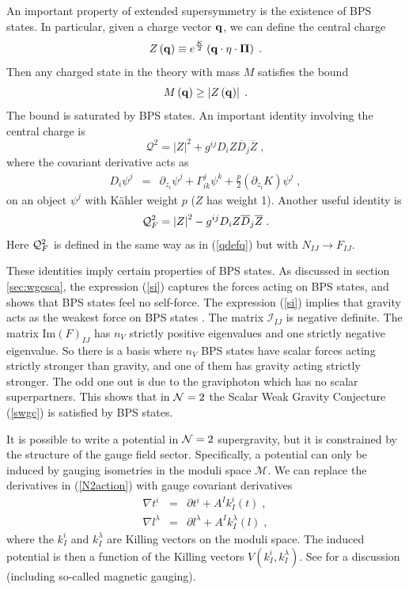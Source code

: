 \documentclass[11pt,a4paper]{article}
\numberwithin{equation}{section}
\numberwithin{table}{section}\setlength{\multlinegap}{25pt}
\newcommand{\bea}{\begin{eqnarray}}  \newcommand{\eea}{\end{eqnarray}}
\newcommand{\nn}{\nonumber}
\newcommand{\cI}{\mathcal{I}}
\newcommand{\cM}{\mathcal M}
\newcommand{\cQ}{\mathcal Q}
\newcommand{\be}{\begin{equation}}
\newcommand{\ee}{\end{equation}}
\begin{document}
An important property of extended supersymmetry is the existence of BPS states. In particular, given a charge vector ${\bf q}$, we can define the central charge
\be
Z\left( {\bf q} \right) \equiv e^{\frac{K}{2}} \left(  {\bf q} \cdot \eta \cdot {\bf \Pi} \right) \;.
\label{Zcc}
\ee
Then any charged state in the theory with mass $M$ satisfies the bound
\be
M\left( {\bf q} \right) \geq \left| Z\left( {\bf q} \right) \right| \;.
\ee
The bound is saturated by BPS states. An important identity involving the central charge is
\be
{\cQ}^2 = \left| Z\right|^2 + g^{ij} D_i Z \overline{D}_j \overline{Z} \;, \label{si}
\ee
where the covariant derivative acts as
\bea
D_i \psi^j &=& \partial_{z_i} \psi^j  + \Gamma^{j}_{ik} \psi^k  + \frac{p}{2}\left(\partial_{z_i} K \right) \psi^j \;,
\eea
on an object $\psi^j$ with K{\"a}hler weight $p$ ($Z$ has weight 1). Another useful identity is
\be
{\cal Q}_F^2 = \left|Z\right|^2 - g^{ij} D_i Z \overline{D}_j \overline{Z} \;. \label{si2}
\ee
Here ${\cal Q}_F^2$ is defined in the same way as in (\ref{qdefq}) but with $N_{IJ} \rightarrow F_{IJ}$. 

These identities imply certain properties of BPS states. As discussed in section \ref{sec:wgcsca}, the expression (\ref{si}) captures the forces acting on BPS states, and shows that BPS states feel no self-force. The expression (\ref{si}) implies that gravity acts as the weakest force on BPS states \cite{Palti:2017elp}.  The matrix $\cI_{IJ}$ is negative definite. The matrix $\mathrm{Im}\left(F\right)_{IJ}$ has $n_V$ strictly positive eigenvalues and one strictly negative eigenvalue. So there is a basis where $n_V$ BPS states have scalar forces acting strictly stronger than gravity, and one of them has gravity acting strictly stronger. The odd one out is due to the graviphoton which has no scalar superpartners. This shows that in ${\cal N}=2$ the Scalar Weak Gravity Conjecture (\ref{swgc}) is satisfied by BPS states.

It is possible to write a potential in ${\cal N}=2$ supergravity, but it is constrained by the structure of the gauge field sector. Specifically, a potential can only be induced by gauging isometries in the moduli space $\cM$. We can replace the derivatives in (\ref{N2action}) with gauge covariant derivatives
\bea
\nabla t^i &=& \partial t^i  + A^I k_I^i\left(t\right) \;,\nn \\
\nabla l^{\lambda} &=& \partial l^{\lambda}   + A^I k_I^{\lambda}\left( l\right) \;,
\eea
where the $k_I^i$ and $k_I^{\lambda}$ are Killing vectors on the moduli space. The induced potential is then a function of the Killing vectors $V\left( k_I^i,k_I^{\lambda} \right)$. See \cite{Andrianopoli:1996cm,Palti:2006yz} for a discussion (including so-called magnetic gauging). 
\end{document}
